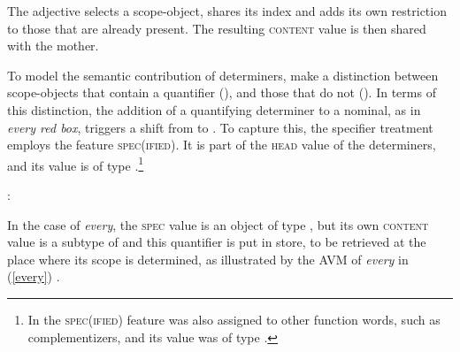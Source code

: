 \documentclass[output=paper
	        ,collection
	        ,collectionchapter
 	        ,biblatex
                ,babelshorthands
                ,newtxmath
                ,draftmode
                ,colorlinks, citecolor=brown
]{langscibook}
\begin{document}
\begin{exe} 
\ex\label{reddd}
\end{exe}

\noindent
The adjective selects a scope-object, shares its index and adds its own 
restriction to those that are already present. The resulting \textsc{content} 
value is then shared with the mother.

\begin{sloppypar}
To model the semantic contribution of determiners, \citet[135--136]{GS00} 
make a distinction between scope-objects that contain a quantifier 
(), and those that do not (). 
In terms of this distinction, the addition of a quantifying determiner to a nominal, 
as in \emph{every red box}, triggers a shift from  to . 
To capture this, the specifier treatment employs the feature \textsc{spec(ified)}. 
It is part of the \textsc{head} value of the determiners, and its value is of type 
 \citep[362]{GS00}.\footnote{In \citet[45]{ps2} the \textsc{spec(ified)}
feature was also assigned to other function words, such as complementizers, 
and its value was of type .}   
\end{sloppypar}

\begin{exe} 
\ex   {}: 
\end{exe} 

\noindent
In the case of \emph{every}, the \textsc{spec} value is an object of 
type , but its own \textsc{content} value is a subtype of 
 and this quantifier is put in store, to be retrieved 
at the place where its scope is determined, as illustrated by the AVM
of \emph{every} in (\ref{every}) \citep[204]{GS00}.  

\begin{exe} 
\ex\label{every} 
\end{exe}
\end{document}
